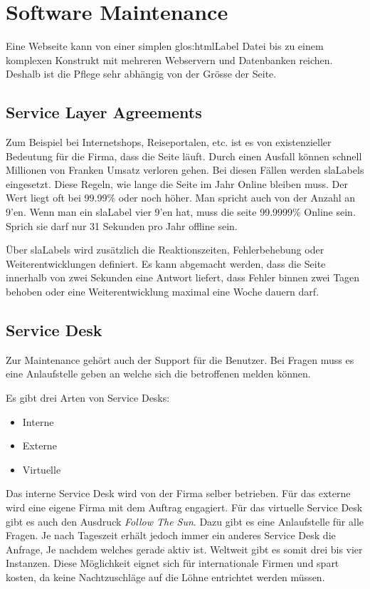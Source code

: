 \chapter{Software Maintenance}
Eine Webseite kann von einer simplen \Gls{glos:htmlLabel} Datei bis zu einem komplexen Konstrukt mit mehreren Webservern und Datenbanken reichen. Deshalb ist die Pflege sehr abhängig von der Grösse der Seite. 

\section{Service Layer Agreements}
Zum Beispiel bei Internetshops, Reiseportalen, etc. ist es von existenzieller Bedeutung für die Firma, dass die Seite läuft. Durch einen Ausfall können schnell Millionen von Franken Umsatz verloren gehen. Bei diesen Fällen werden \glspl{slaLabel} eingesetzt. Diese Regeln, wie lange die Seite im Jahr Online bleiben muss. Der Wert liegt oft bei 99.99\% oder noch höher. Man spricht auch von der Anzahl an 9'en. Wenn man ein \gls{slaLabel} vier 9'en hat, muss die seite 99.9999\% Online sein. Sprich sie darf nur 31 Sekunden pro Jahr offline sein.

Über \glspl{slaLabel} wird zusätzlich die Reaktionszeiten, Fehlerbehebung oder Weiterentwicklungen definiert. Es kann abgemacht werden, dass die Seite innerhalb von zwei Sekunden eine Antwort liefert, dass Fehler binnen zwei Tagen behoben oder eine Weiterentwicklung maximal eine Woche dauern darf.

\section{Service Desk}
Zur Maintenance gehört auch der Support für die Benutzer. Bei Fragen muss es eine Anlaufstelle geben an welche sich die betroffenen melden können.

Es gibt drei Arten von Service Desks:
\begin{itemize}
\item Interne
\item Externe
\item Virtuelle
\end{itemize}

Das interne Service Desk wird von der Firma selber betrieben. Für das externe wird eine eigene Firma mit dem Auftrag engagiert. Für das virtuelle Service Desk gibt es auch den Ausdruck \textit{Follow The Sun}. Dazu gibt es eine Anlaufstelle für alle Fragen. Je nach Tageszeit erhält jedoch immer ein anderes Service Desk die Anfrage, Je nachdem welches gerade aktiv ist. Weltweit gibt es somit drei bis vier Instanzen. Diese Möglichkeit eignet sich für internationale Firmen und spart kosten, da keine Nachtzuschläge auf die Löhne entrichtet werden müssen.